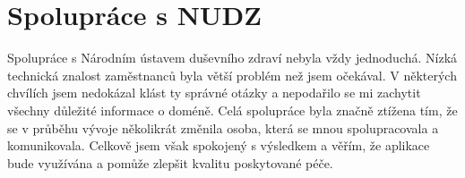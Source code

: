 \section{Spolupráce s NUDZ}\label{sec:spoluprace-s-nudz}

Spolupráce s Národním ústavem duševního zdraví nebyla vždy jednoduchá.
Nízká technická znalost zaměstnanců byla větší problém než jsem očekával.
V některých chvílích jsem nedokázal klást ty správné otázky a nepodařilo se mi zachytit všechny důležité informace o doméně.
Celá spolupráce byla značně ztížena tím, že se v průběhu vývoje několikrát změnila osoba, která se mnou spolupracovala a komunikovala.
Celkově jsem však spokojený s výsledkem a věřím, že aplikace bude využívána a pomůže zlepšit kvalitu poskytované péče.
